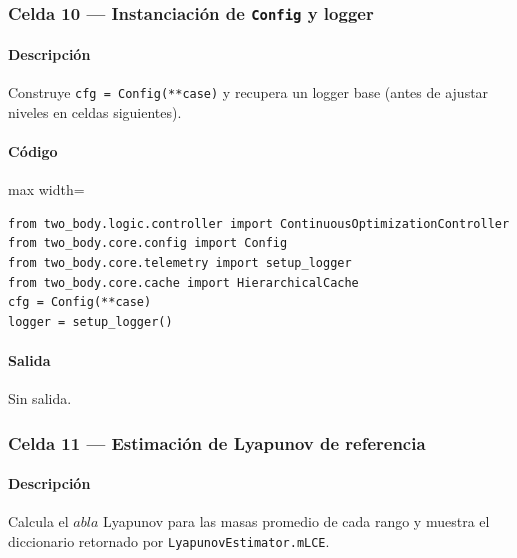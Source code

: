 \subsubsection*{Celda 10 — Instanciación de \texttt{Config} y logger}
\paragraph{Descripción} Construye \texttt{cfg = Config(**case)} y recupera un logger base (antes de ajustar niveles en celdas siguientes). %
\paragraph{Código}
\begin{listing}[H]
\caption{Celda 10: creación de la configuración de trabajo}
\begin{adjustbox}{max width=\textwidth}
\begin{minipage}{\textwidth}
\begin{verbatim}
from two_body.logic.controller import ContinuousOptimizationController
from two_body.core.config import Config
from two_body.core.telemetry import setup_logger
from two_body.core.cache import HierarchicalCache
cfg = Config(**case)
logger = setup_logger()
\end{verbatim}
\end{minipage}
\end{adjustbox}
\end{listing}
\paragraph{Salida} Sin salida.

\subsubsection*{Celda 11 — Estimación de Lyapunov de referencia}
\paragraph{Descripción} Calcula el $
abla$ Lyapunov para las masas promedio de cada rango y muestra el diccionario retornado por \texttt{LyapunovEstimator.mLCE}.
